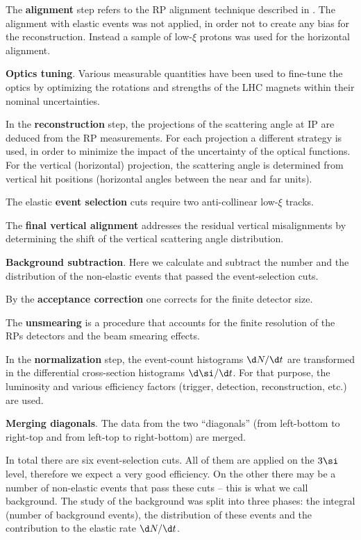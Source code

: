 \> The {\bf alignment} step refers to the RP alignment technique described in . The alignment with elastic events was not applied, in order not to create any bias for the reconstruction. Instead a sample of low-$\xi$ protons was used for the horizontal alignment.

\> {\bf Optics tuning}. Various measurable quantities have been used to fine-tune the optics by optimizing the rotations and strengths of the LHC magnets within their nominal uncertainties.

\> In the {\bf reconstruction} step, the projections of the scattering angle at IP are deduced from the RP measurements. For each projection a different strategy is used, in order to minimize the impact of the uncertainty of the optical functions. For the vertical (horizontal) projection, the scattering angle is determined from vertical hit positions (horizontal angles between the near and far units).

\> The elastic {\bf event selection} cuts require two anti-collinear low-$\xi$ tracks.

\> The {\bf final vertical alignment} addresses the residual vertical misalignments by determining the shift of the vertical scattering angle distribution.

\> {\bf Background subtraction}. Here we calculate and subtract the number and the distribution of the non-elastic events that passed the event-selection cuts.

\> By the {\bf acceptance correction} one corrects for the finite detector size.

\> The {\bf unsmearing} is a procedure that accounts for the finite resolution of the RPs detectors and the beam smearing effects.

\> In the {\bf normalization} step, the event-count histograms $\d N/\d t$ are transformed in the differential cross-section histograms $\d\si/\d t$. For that purpose, the luminosity and various efficiency factors (trigger, detection, reconstruction, etc.) are used.

\> {\bf Merging diagonals}. The data from the two ``diagonals'' (from left-bottom to right-top and from left-top to right-bottom) are merged.

\vskip1mm

In total there are six event-selection cuts. All of them are applied on the $3\si$ level, therefore we expect a very good efficiency. On the other there may be a number of non-elastic events that pass these cuts -- this is what we call background. The study of the background was split into three phases: the integral (number of background events), the distribution of these events and the contribution to the elastic rate $\d N/\d t$.

